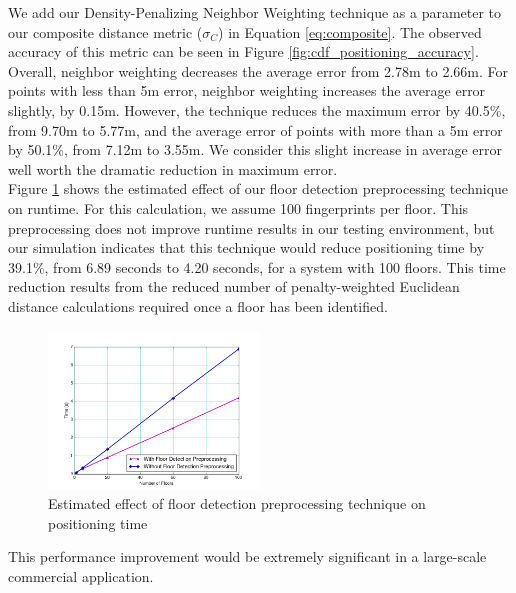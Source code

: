 \documentclass[conference]{IEEEtran}
\begin{document}
We add our Density-Penalizing Neighbor Weighting technique as a parameter to our composite distance metric ($\sigma_C$) in Equation \ref{eq:composite}. The observed accuracy of this metric can be seen in Figure \ref{fig:cdf_positioning_accuracy}. Overall, neighbor weighting decreases the average error from 2.78m to 2.66m. For points with less than 5m error, neighbor weighting increases the average error slightly, by 0.15m. However, the technique reduces the maximum error by 40.5\%, from 9.70m to 5.77m, and the average error of points with more than a 5m error by 50.1\%, from 7.12m to 3.55m. We consider this slight increase in average error well worth the dramatic reduction in maximum error. \\	
\indent Figure \ref{fig:floor_preprocessing_effect} shows the estimated effect of our floor detection preprocessing technique on runtime. For this calculation, we assume 100 fingerprints per floor. This preprocessing does not improve runtime results in our testing environment, but our simulation indicates that this technique would reduce positioning time by 39.1\%, from 6.89 seconds to 4.20 seconds, for a system with 100 floors. This time reduction results from the reduced number of penalty-weighted Euclidean distance calculations required once a floor has been identified.


\begin{figure}[h!]
  \centering
    \includegraphics[width=0.5\textwidth]{time_comparison.png}
   \caption{Estimated effect of floor detection preprocessing technique on positioning time}
   \label{fig:floor_preprocessing_effect}
\end{figure}

This performance improvement would be extremely significant in a large-scale commercial application.
\end{document}

